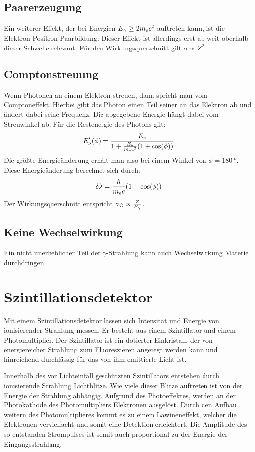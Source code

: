 \documentclass[11pt, ngerman, fleqn, DIV=15, headinclude, BCOR=2cm]{scrreprt}
\begin{document}
\subsection{Paarerzeugung}
Ein weiterer Effekt, der bei Energien $E_\gamma \ge 2m_\text ec^2$ auftreten
kann, ist die Elektron-Positron-Paarbildung.
Dieser Effekt ist allerdings erst ab weit oberhalb dieser Schwelle relevant.
Für den Wirkungsquerschnitt gilt $\sigma \propto Z^2$.

\subsection{Comptonstreuung}
Wenn Photonen an einem Elektron streuen, dann spricht man vom Comptoneffekt. 
Hierbei gibt das Photon einen Teil seiner an das Elektron ab und ändert dabei
seine Frequenz.
Die abgegebene Energie hängt dabei vom Streuwinkel ab.
Für die Restenergie des Photons gilt:
\[
    E_\nu'(\phi) = \frac{E_\nu}{1+\frac{E_\nu}{m_\text ec^2}(1+\cos(\phi))}
\]
Die größte Energieänderung erhält man also bei einem Winkel von
$\phi=\SI{180}{\degree}$.
Diese Energieänderung berechnet sich durch:
\[
    \delta\lambda = \frac{h}{m_\text ec}(1-\cos(\phi))
\]
Der Wirkungsquerschnitt entspricht $\sigma_\text C \propto \frac{Z}{E_\gamma}$.

\subsection{Keine Wechselwirkung}
Ein nicht unerheblicher Teil der $\gamma$-Strahlung kann auch Wechselwirkung
Materie durchdringen.

\section{Szintillationsdetektor}
Mit einem Szintillationsdetektor lassen sich Intensität und Energie von
ionisierender Strahlung messen.
Er besteht aus einem Szintillator und einem Photomultiplier.
Der Szintillator ist ein dotierter Einkristall, der von energiereicher
Strahlung zum Fluoreszieren angeregt werden kann und hinreichend
durchlässig für das von ihm emittierte Licht ist.

Innerhalb des vor Lichteinfall geschützten Szintillators entstehen durch
ionisierende Strahlung Lichtblitze. 
Wie viele dieser Blitze auftreten ist von der Energie der Strahlung abhängig.
Aufgrund des Photoeffektes, werden an der Photokathode des Photomultipliers
Elektronen ausgelöst.
Durch den Aufbau weitern des Photomultiplieres kommt es zu einem Lawineneffekt,
welcher die Elektronen vervielfacht und somit eine Detektion erleichtert.
Die Amplitude des so entstanden Strompulses ist somit auch proportional zu der
Energie der Eingangsstrahlung.
\end{document}
